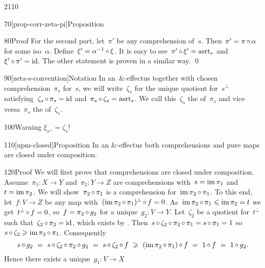 \begin{parsec}{2110}
\begin{point}{70}[prop-corr-zeta-pi]{Proposition}
\begin{point}{80}{Proof}
For the second part,
let~$\pi'$ be any comprehension of~$s$.
Then~$\pi' = \pi \mathop{\circ} \alpha$ for some iso~$\alpha$.
Define~$\xi' = \alpha^{-1} \mathop{\circ} \xi$.
It is easy to see~$\pi' \mathop{\circ} \xi' = \mathrm{asrt}_s$
and~$\xi' \mathop{\circ} \pi' = \mathrm{id}$.
The other statement is proven in a similar way. \qed
\end{point}
\begin{point}{90}[zeta-s-convention]{Notation}%
In an~$\&$-effectus
    together with chosen comprehension~$\pi_s$ for~$s$,
    we will write~$\zeta_s$
    for the unique quotient for~$s^\perp$
    satisfying~$\zeta_s \mathop{\circ} \pi_s = \mathrm{id}$
    and~$\pi_s \mathop{\circ} \zeta_s = \mathrm{asrt}_s$.
We call this~$\zeta_s$
    the  of~$\pi_s$
    and vice versa~$\pi_s$ the 
    of~$\zeta_s$. 
\end{point}
\begin{point}{100}{Warning}%
    $\xi_{s^\perp} = \zeta_s$!
\end{point}
\end{point}
\begin{point}{110}[upm-closed]{Proposition}%
In an $\&$-effectus
    both comprehensions and pure maps are closed under composition.
\begin{point}{120}{Proof}%
We will first prove that comprehensions are closed under composition.
Assume~$\pi_1 \colon X \to Y$
    and~$\pi_2 \colon Y \to Z$
    are comprehensions with~$s = \operatorname{im} \pi_1$
    and~$t = \operatorname{im} \pi_2$.
We will show~$\pi_2 \mathop{\circ} \pi_1$
    is a comprehension for~$\operatorname{im} \pi_2 \mathop{\circ} \pi_1$.
To this end, let~$f\colon V\to Z$ be any map
with~$(\operatorname{im} \pi_2 \mathop{\circ} \pi_1)^\perp \mathop{\circ} f = 0$.
As~$\operatorname{im} \pi_2 \mathop{\circ} \pi_1 \leqslant \operatorname{im} \pi_2 = t$
    we get~$t^\perp \mathop{\circ} f = 0$,
    so~$f = \pi_2 \mathop{\circ} g_2$ for a unique~$g_2\colon V \to Y$.
Let~$\zeta_2$ be a quotient for~$t^\perp$
such that~$\zeta_2 \mathop{\circ} \pi_2 = \mathrm{id}$,
which exists by .
Then~$s \mathop{\circ} \zeta_2 \mathop{\circ} \pi_2 \mathop{\circ} \pi_1
            = s \mathop{\circ} \pi_1 = 1$
            so~$s \mathop{\circ} \zeta_2 \geqslant \operatorname{im} \pi_2 \mathop{\circ} \pi_1$.
Consequently
\begin{equation*}
    s \mathop{\circ} g_2 \ =\  s \mathop{\circ} \zeta_2 \mathop{\circ} \pi_2 \mathop{\circ} g_2
        \ =\  s \mathop{\circ} \zeta_2 \mathop{\circ} f
        \ \geqslant\   (\operatorname{im} \pi_2 \mathop{\circ} \pi_1) \mathop{\circ} f \ =\  1 \mathop{\circ} f
                \ =\  1 \mathop{\circ} g_2.
\end{equation*}
Hence there exists a unique~$g_1\colon V \to X$

\end{point}
\end{point}
\end{parsec}
